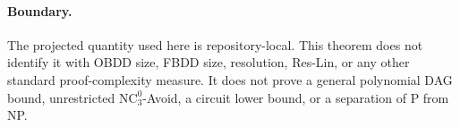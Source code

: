 \documentclass[11pt]{article}
\begin{document}
\paragraph{Boundary.}
The projected quantity used here is repository-local.  This theorem does not identify it with OBDD size, FBDD size, resolution, Res-Lin, or any other standard proof-complexity measure.  It does not prove a general polynomial DAG bound, unrestricted $\mathrm{NC}^0_3$-Avoid, a circuit lower bound, or a separation of P from NP.
\end{document}
